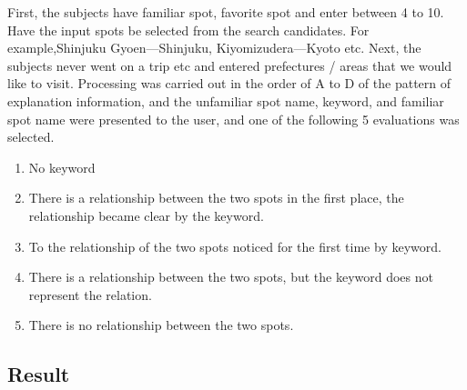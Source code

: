 \documentclass[journal]{IAENGtran}
\begin{document}
First, the subjects have familiar spot, favorite spot and enter between 4 to 10.
Have the input spots be selected from the search candidates.
For example,Shinjuku Gyoen---Shinjuku, Kiyomizudera---Kyoto etc.
Next, the subjects never went on a trip etc and entered prefectures / areas that we would like to visit.
Processing was carried out in the order of A to D of the pattern of explanation information, and the unfamiliar spot name, keyword, and familiar spot name were presented to the user, and one of the following 5 evaluations was selected.
\begin{enumerate}
  \item No keyword
  \item There is a relationship between the two spots in the first place, the relationship became clear by the keyword.
  \item To the relationship of the two spots noticed for the first time by keyword.
  \item There is a relationship between the two spots, but the keyword does not represent the relation.
  \item There is no relationship between the two spots.
\end{enumerate}

\subsection{Result}
\label{subsec:Result}
\end{document}
